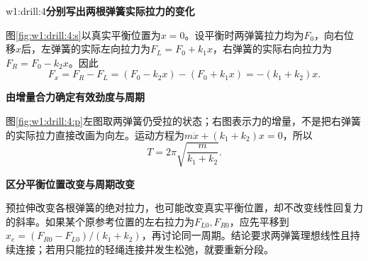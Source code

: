 \begin{drillsolution}{w1:drill:4}\textbf{分别写出两根弹簧实际拉力的变化}\par\nobreak
图\ref{fig:w1:drill:4:s}以真实平衡位置为$x=0$。设平衡时两弹簧拉力均为$F_0$，向右位移$x$后，左弹簧的实际左向拉力为$F_L=F_0+k_1x$，右弹簧的实际右向拉力为$F_R=F_0-k_2x$。因此
\[
 F_x=F_R-F_L=(F_0-k_2x)-(F_0+k_1x)=-(k_1+k_2)x.
\]


\par\medskip{}\noindent\textbf{由增量合力确定有效劲度与周期}\par\nobreak
图\ref{fig:w1:drill:4:p}左图取两弹簧仍受拉的状态；右图表示力的增量，不是把右弹簧的实际拉力直接改画为向左。运动方程为$m\ddot x+(k_1+k_2)x=0$，所以
\[
 \boxed{T=2\pi\sqrt{\frac{m}{k_1+k_2}}}.
\]


\par\medskip{}\noindent\textbf{区分平衡位置改变与周期改变}\par\nobreak
预拉伸改变各根弹簧的绝对拉力，也可能改变真实平衡位置，却不改变线性回复力的斜率。如果某个原参考位置的左右拉力为$F_{L0},F_{R0}$，应先平移到$x_e=(F_{R0}-F_{L0})/(k_1+k_2)$，再讨论同一周期。结论要求两弹簧理想线性且持续连接；若用只能拉的轻绳连接并发生松弛，就要重新分段。
\end{drillsolution}
